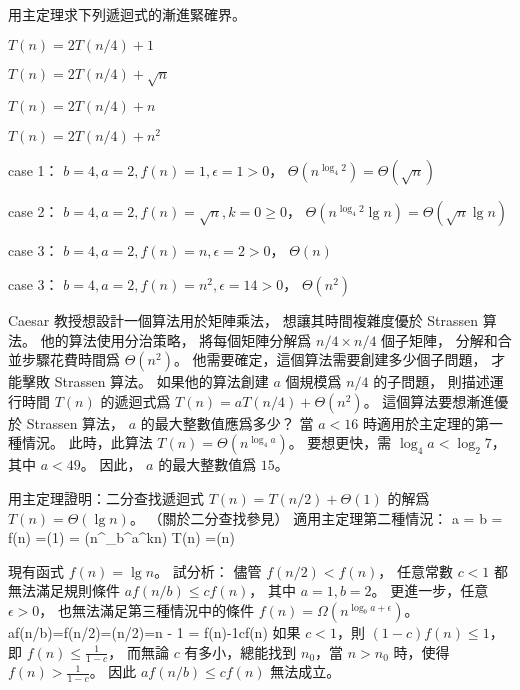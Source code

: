 \startsection[
  title={The master method for solving recurrences},
]

\startEXERCISE
用主定理求下列遞迴式的漸進緊確界。
\startigBase[a]
\item $T(n) = 2T(n/4) + 1$
\item $T(n) = 2T(n/4) + \sqrt{n}$
\item $T(n) = 2T(n/4) + n$
\item $T(n) = 2T(n/4) + n^2$
\stopigBase
\stopEXERCISE
\startANSWER
\startigBase[a]
\item case 1： $b=4,a=2,f(n)=1,\epsilon=1>0$， $\Theta(n^{\log_4{2}}) = \Theta(\sqrt{n})$
\item case 2： $b=4,a=2,f(n)=\sqrt{n},k=0\ge 0$， $\Theta(n^{\log_4{2}}\lg{n}) = \Theta(\sqrt{n}\lg{n})$
\item case 3： $b=4,a=2,f(n)=n,\epsilon=2>0$， $\Theta(n)$
\item case 3： $b=4,a=2,f(n)=n^2,\epsilon=14>0$， $\Theta(n^2)$
\stopigBase
\stopANSWER

\startEXERCISE
Caesar 教授想設計一個算法用於矩陣乘法，
想讓其時間複雜度優於 Strassen 算法。
他的算法使用分治策略，
將每個矩陣分解爲 $n/4 \times n/4$ 個子矩陣，
分解和合並步驟花費時間爲 $\Theta(n^2)$。
他需要確定，這個算法需要創建多少個子問題，
才能擊敗 Strassen 算法。
如果他的算法創建 $a$ 個規模爲 $n/4$ 的子問題，
則描述運行時間 $T(n)$ 的遞迴式爲 $T(n) = a T(n/4) + \Theta(n^2)$。
這個算法要想漸進優於 Strassen 算法， $a$ 的最大整數值應爲多少？
\stopEXERCISE
\startANSWER
當 $a < 16$ 時適用於主定理的第一種情況。
此時，此算法 $T(n) = \Theta(n^{\log_4{a}})$。
要想更快，需 $\log_4{a} < \log_{2}7$，其中 $a < 49$。
因此， $a$ 的最大整數值爲 $15$。
\stopANSWER

\startEXERCISE
用主定理證明：二分查找遞迴式 $T(n) = T(n/2) + \Theta(1)$ 的解爲 $T(n) = \Theta(\lg n)$。
（關於二分查找參見）
\stopEXERCISE
\startANSWER
適用主定理第二種情況：
\startsplitformula\startmathalignment
\NC a =\NR
\NC b =\NR
\NC f(n) =\NC \Theta(1) = \Theta(n^{\log_b^a}\lg^{k}n)  \NR
\NC T(n) =\NC \Theta(\lg n) \NR
\stopmathalignment\stopsplitformula
\stopANSWER

\startEXERCISE
現有函式 $f(n)=\lg n$。
試分析：
儘管 $f(n/2)<f(n)$，
任意常數 $c<1$ 都無法滿足規則條件 $af(n/b)\le cf(n)$，
其中 $a=1,b=2$。
更進一步，任意 $\epsilon>0$，
也無法滿足第三種情況中的條件 $f(n)=\Omega(n^{\log_b{a+\epsilon}})$。
\stopEXERCISE
\startANSWER
\startformula
af(n/b)=f(n/2)=\lg(n/2)=\lg n - 1 = f(n)-1\le cf(n)
\stopformula
如果 $c<1$，則 $(1-c)f(n)\le 1$，即 $f(n)\le \frac{1}{1-c}$，
而無論 $c$ 有多小，總能找到 $n_0$，當 $n>n_0$ 時，使得 $f(n)>\frac{1}{1-c}$。
因此 $af(n/b)\le cf(n)$ 無法成立。


